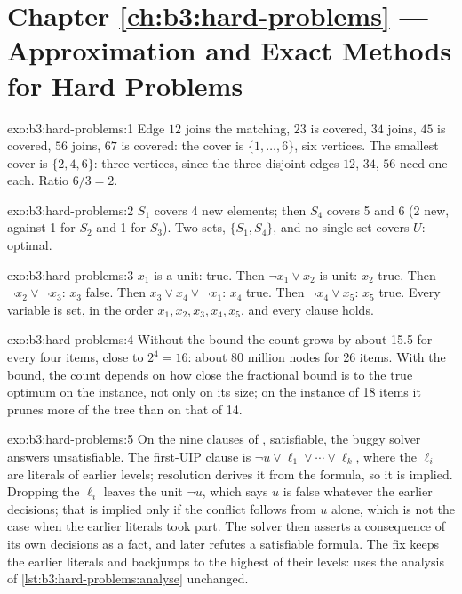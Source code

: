 \section*{Chapter \ref{ch:b3:hard-problems} --- Approximation and Exact Methods for Hard Problems}

\begin{solution}{exo:b3:hard-problems:1}
Edge $12$ joins the matching, $23$ is covered, $34$ joins, $45$ is covered, $56$ joins, $67$ is covered: the cover is $\{1, \ldots, 6\}$, six vertices. The smallest cover is $\{2, 4, 6\}$: three vertices, since the three disjoint edges $12$, $34$, $56$ need one each. Ratio $6/3 = 2$.
\end{solution}

\begin{solution}{exo:b3:hard-problems:2}
$S_1$ covers 4 new elements; then $S_4$ covers 5 and 6 (2 new, against 1 for $S_2$ and 1 for $S_3$). Two sets, $\{S_1, S_4\}$, and no single set covers $U$: optimal.
\end{solution}

\begin{solution}{exo:b3:hard-problems:3}
$x_1$ is a unit: true. Then $\neg x_1 \vee x_2$ is unit: $x_2$ true. Then $\neg x_2 \vee \neg x_3$: $x_3$ false. Then $x_3 \vee x_4 \vee \neg x_1$: $x_4$ true. Then $\neg x_4 \vee x_5$: $x_5$ true. Every variable is set, in the order $x_1, x_2, x_3, x_4, x_5$, and every clause holds.
\end{solution}

\begin{solution}{exo:b3:hard-problems:4}
Without the bound the count grows by about 15.5 for every four items, close to $2^4 = 16$: about 80 million nodes for 26 items. With the bound, the count depends on how close the fractional bound is to the true optimum on the instance, not only on its size; on the instance of 18 items it prunes more of the tree than on that of 14.
\end{solution}

\begin{solution}{exo:b3:hard-problems:5}
On the nine clauses of , satisfiable, the buggy solver answers unsatisfiable. The first-UIP clause is $\neg u \vee \ell_1 \vee \cdots \vee \ell_k$, where the $\ell_i$ are literals of earlier levels; resolution derives it from the formula, so it is implied. Dropping the $\ell_i$ leaves the unit $\neg u$, which says $u$ is false whatever the earlier decisions; that is implied only if the conflict follows from $u$ alone, which is not the case when the earlier literals took part. The solver then asserts a consequence of its own decisions as a fact, and later refutes a satisfiable formula. The fix keeps the earlier literals and backjumps to the highest of their levels:  uses the analysis of \cref{lst:b3:hard-problems:analyse} unchanged.
\end{solution}

